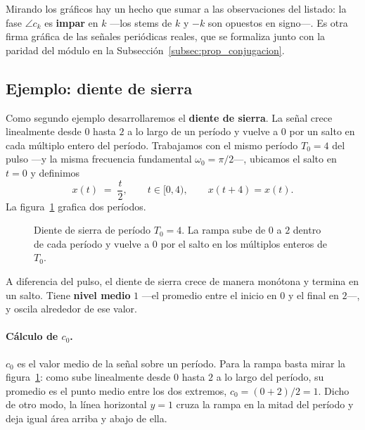 \documentclass[class=book, crop=false]{standalone}
\begin{document}
Mirando los gráficos hay un hecho que sumar a las observaciones
del listado: la fase $\angle c_k$ es \textbf{impar} en $k$
---los stems de $k$ y $-k$ son opuestos en signo---. Es otra
firma gráfica de las señales periódicas reales, que se
formaliza junto con la paridad del módulo en la
Subsección~\ref{subsec:prop_conjugacion}.

\subsection{Ejemplo: diente de sierra}
\label{subsec:ejemplo_sierra}

Como segundo ejemplo desarrollaremos el \textbf{diente de
sierra}. La señal crece linealmente desde $0$ hasta $2$ a lo
largo de un período y vuelve a $0$ por un salto en cada
múltiplo entero del período. Trabajamos con el mismo período
$T_0 = 4$ del pulso ---y la misma frecuencia fundamental
$\omega_0 = \pi/2$---, ubicamos el salto en $t = 0$ y
definimos
\begin{equation*}
    x(t) \;=\; \frac{t}{2}, \qquad t \in [0, 4),
    \qquad x(t+4) = x(t).
\end{equation*}
La figura~\ref{fig:diente_sierra_sf} grafica dos períodos.

\begin{figure}[H]
    \centering
    \begin{minipage}{\linewidth}
        \centering
        
        \caption{Diente de sierra de período $T_0 = 4$. La
                 rampa sube de $0$ a $2$ dentro de cada
                 período y vuelve a $0$ por el salto en los
                 múltiplos enteros de $T_0$.}
        \label{fig:diente_sierra_sf}
    \end{minipage}
\end{figure}

A diferencia del pulso, el diente de sierra crece de manera
monótona y termina en un salto. Tiene \textbf{nivel medio} $1$
---el promedio entre el inicio en $0$ y el final en $2$---, y
oscila alrededor de ese valor.

\paragraph{Cálculo de $c_0$.}
$c_0$ es el valor medio de la señal sobre un período. Para la
rampa basta mirar la figura~\ref{fig:diente_sierra_sf}: como sube
linealmente desde $0$ hasta $2$ a lo largo del período, su
promedio es el punto medio entre los dos extremos,
$c_0 = (0+2)/2 = 1$. Dicho de otro modo, la línea horizontal
$y = 1$ cruza la rampa en la mitad del período y deja igual área
arriba y abajo de ella.
\end{document}
